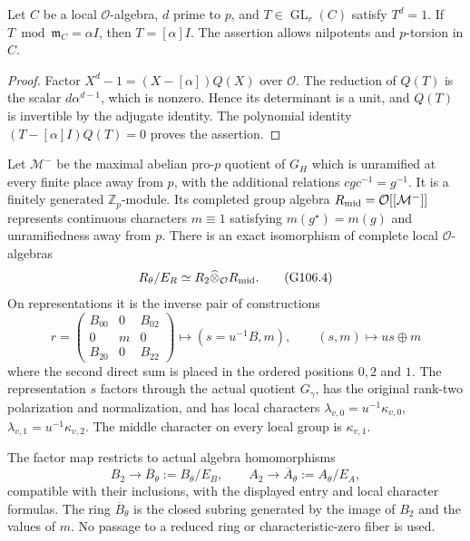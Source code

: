 \begin{lemma}
\label{lem:G106scalar}
Let \(C\) be a local \(\mathcal O\)-algebra, \(d\) prime to \(p\),
and \(T\in\operatorname{GL}_r(C)\) satisfy \(T^d=1\).
If \(T\bmod\mathfrak m_C=\alpha I\), then
\(T=[\alpha]I\).  The assertion allows nilpotents and
\(p\)-torsion in \(C\).
\end{lemma}
\begin{proof}
Factor
\(X^d-1=(X-[\alpha])Q(X)\) over \(\mathcal O\).
The reduction of \(Q(T)\) is the scalar
\(d\alpha^{d-1}\), which is nonzero.  Hence its determinant
is a unit, and \(Q(T)\) is invertible by the adjugate identity.
The polynomial identity
\((T-[\alpha]I)Q(T)=0\) proves the assertion.
\end{proof}

\begin{proposition}
\label{AC-G106-corner}
Let \(\mathcal M^-\) be the maximal abelian pro-\(p\) quotient
of \(G_H\) which is unramified at every finite place away from
\(p\), with the additional relations \(cgc^{-1}=g^{-1}\).
It is a finitely generated \(\mathbb Z_p\)-module.  Its completed
group algebra \(R_{\rm mid}=\mathcal O[[\mathcal M^-]]\) represents
continuous characters \(m\equiv1\) satisfying
\(m(g^\star)=m(g)\) and unramifiedness away from \(p\).
There is an exact isomorphism of complete local \(\mathcal O\)-algebras
\[
 R_\theta/E_R
       \simeq R_2\widehat\otimes_{\mathcal O}R_{\rm mid}.
 \tag{G106.4}
\]
On representations it is the inverse pair of constructions
\[
 r=\begin{pmatrix}B_{00}&0&B_{02}\\0&m&0\\B_{20}&0&B_{22}\end{pmatrix}
       \longmapsto (s=u^{-1}B,m),
 \qquad
 (s,m)\longmapsto u s\oplus m
 \tag{G106.5}
\]
where the second direct sum is placed in the ordered positions
\(0,2\) and \(1\).
The representation \(s\) factors through the actual quotient
\(G_\gamma\), has the original rank-two polarization and
normalization, and has local characters
\(\lambda_{v,0}=u^{-1}\kappa_{v,0}\),
\(\lambda_{v,1}=u^{-1}\kappa_{v,2}\).
The middle character on every local group is \(\kappa_{v,1}\).

The factor map restricts to actual algebra homomorphisms
\[
 B_2\longrightarrow \overline B_\theta:=B_\theta/E_B,
 \qquad
 A_2\longrightarrow \overline A_\theta:=A_\theta/E_A,
 \tag{G106.6}
\]
compatible with their inclusions, with the displayed entry and local
character formulas.  The ring \(\overline B_\theta\) is the closed
subring generated by the image of \(B_2\) and the values of \(m\).
No passage to a reduced ring or characteristic-zero fiber is used.
\end{proposition}

